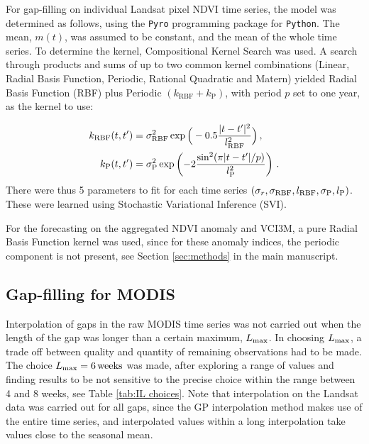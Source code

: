 \documentclass[review]{elsarticle}
\begin{document}
For gap-filling on individual Landsat pixel NDVI time series, the model was determined as follows, using the \texttt{Pyro} programming package for \texttt{Python}. The mean, $m(t)$, was assumed to be constant, and the mean of the whole time series. To determine the kernel, Compositional Kernel Search \citep{pmlr-v28-duvenaud13} was used. A search through products and sums of up to two common kernel combinations (Linear, Radial Basis Function, Periodic, Rational Quadratic and Matern) yielded Radial Basis Function (RBF) plus Periodic $(k_{\mathrm{RBF}} + k_{\mathrm{P}})$, with period $p$ set to one year, as the kernel to use:

\begin{align}
	k_{\rm{RBF}}(t,t') &= \sigma_{\rm{RBF}}^2 \exp{\Big( -0.5 \frac{|t-t'|^2}{l_{\rm{RBF}}^2} \Big) }\,,\\
	k_{\rm{P}}(t,t')&=\sigma_{\rm{P}}^2 \exp \left( -2 \frac{ \sin^2(\pi|t-t'|/p)}{l_{\mathrm{P}}^2} \right)\,.
\end{align}
There were thus 5 parameters to fit for each time series $(\sigma_r,\sigma_{\rm{RBF}},l_{\rm{RBF}},\sigma_{\rm{P}},l_{\mathrm{P}})$. These were learned using Stochastic Variational Inference (SVI).

For the forecasting on the aggregated NDVI anomaly and VCI3M, a pure Radial Basis Function kernel was used, since for these anomaly indices, the periodic component is not present, see Section \ref{sec:methods} in the main manuscript.


\subsection{Gap-filling for MODIS}\label{sec:Lmax}

Interpolation of gaps in the raw MODIS time series was not carried out when the length of the gap was longer than a certain maximum, $L_{\rm{max}}$. In choosing $L_{\rm{max}}$, a trade off between quality and quantity of remaining observations had to be made. The choice $L_{\rm{max}}=6\, \rm{weeks}$ was made, after exploring a range of values and finding results to be not sensitive to the precise choice within the range between 4 and 8 weeks, see Table \ref{tab:IL choices}. 
Note that interpolation on the Landsat data was carried out for all gaps, since the GP interpolation method makes use of the entire time series, and interpolated values within a long interpolation take values close to the seasonal mean.
\end{document}

